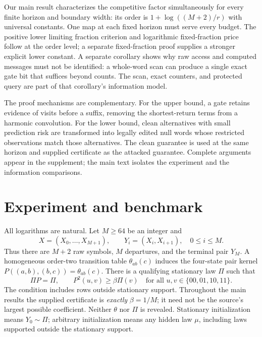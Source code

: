 \documentclass[11pt,letterpaper]{article}
\theoremstyle{definition}
\theoremstyle{remark}
\numberwithin{equation}{section}
\begin{document}
Our main result characterizes the competitive factor simultaneously for every finite horizon and boundary width: its order is $1+\log((M+2)/r)$ with universal constants. One map at each fixed horizon must serve every budget. The positive lower limiting fraction criterion and logarithmic fixed-fraction price follow at the order level; a separate fixed-fraction proof supplies a stronger explicit lower constant. A separate corollary shows why raw access and computed messages must not be identified: a whole-word scan can produce a single exact gate bit that suffices beyond counts. The scan, exact counters, and protected query are part of that corollary's information model.

The proof mechanisms are complementary. For the upper bound, a gate retains evidence of visits before a suffix, removing the shortest-return terms from a harmonic convolution. For the lower bound, clean alternatives with small prediction risk are transformed into legally edited null words whose restricted observations match those alternatives. The clean guarantee is used at the same horizon and supplied certificate as the attacked guarantee. Complete arguments appear in the supplement; the main text isolates the experiment and the information comparisons.

\section{Experiment and benchmark}\label{sec:experiment}
All logarithms are natural. Let $M\ge64$ be an integer and
\[
 X=(X_0,\ldots,X_{M+1}),\qquad Y_i=(X_i,X_{i+1}),\quad 0\le i\le M.
\]
Thus there are $M+2$ raw symbols, $M$ departures, and the terminal pair $Y_M$. A homogeneous order-two transition table $\theta_{ab}(c)$ induces the four-state pair kernel
$P((a,b),(b,c))=\theta_{ab}(c)$. There is a qualifying stationary law $\Pi$ such that
\begin{equation}\label{eq:certificate}
 \Pi P=\Pi,\qquad P^2(u,v)\ge\beta\Pi(v)\quad\text{for all }u,v\in\{00,01,10,11\}.
\end{equation}
The condition includes rows outside stationary support. Throughout the main results the supplied certificate is \emph{exactly} $\beta=1/M$; it need not be the source's largest possible coefficient. Neither $\theta$ nor $\Pi$ is revealed. Stationary initialization means $Y_0\sim\Pi$; arbitrary initialization means any hidden law $\mu$, including laws supported outside the stationary support.
\end{document}
